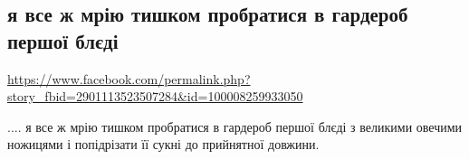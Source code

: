  
 
 
 
 
\subsection{я все ж мрію тишком пробратися в гардероб першої блєді}
\url{https://www.facebook.com/permalink.php?story_fbid=2901113523507284&id=100008259933050}

.... я все ж мрію тишком пробратися в гардероб першої блєді з великими овечими
ножицями і попідрізати її сукні до прийнятної довжини.
